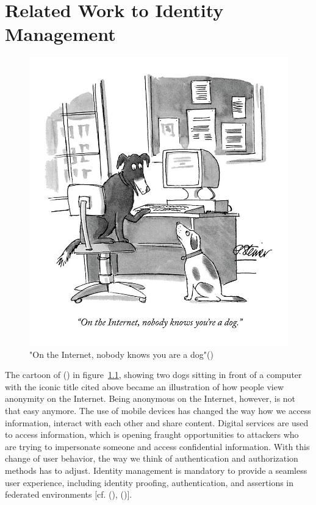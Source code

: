 \chapter{Related Work to Identity Management}\label{chap:authenticationandauthorization}

\chapterstart



\begin{figure}[h]
	\centering
	\includegraphics[width=0.6\linewidth]{images/on-the-internet-peter-steine}
	\caption{"On the Internet, nobody knows you are a dog"(\cite{Steiner:Dog:1992})}
	\label{fig:on-the-internet-peter-steine}
\end{figure}

The cartoon of (\cite{Steiner:Dog:1992}) in figure~\ref{fig:on-the-internet-peter-steine}, showing two dogs sitting in front of a computer with the iconic title cited above became an illustration of how people view anonymity on the Internet. Being anonymous on the Internet, however, is not that easy anymore. The use of mobile devices has changed the way how we access information, interact with each other and share content. Digital services are used to access information, which is opening fraught opportunities to attackers who are trying to impersonate someone and access confidential information.  With this change of user behavior, the way we think of authentication and authorization methods has to adjust. Identity management is mandatory to provide a seamless user experience, including identity proofing, authentication, and assertions in federated environments [cf. (\cite{NIST:2017:DIG}), (\cite{Corre:2017:WHI})].


